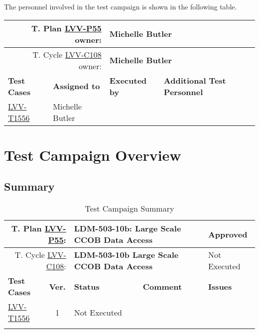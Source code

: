 \documentclass[DM,lsstdraft,STR,toc]{lsstdoc}
\begin{document}
The personnel involved in the test campaign is shown in the following table.

{\small
\begin{longtable}{p{3cm}p{3cm}p{3cm}p{6cm}}
\hline
\multicolumn{2}{r}{T. Plan \href{https://jira.lsstcorp.org/secure/Tests.jspa\#/testPlan/LVV-P55}{LVV-P55} owner:} &
\multicolumn{2}{l}{\textbf{ Michelle Butler } }\\\hline
\multicolumn{2}{r}{T. Cycle \href{https://jira.lsstcorp.org/secure/Tests.jspa\#/testCycle/LVV-C108}{LVV-C108} owner:} &
\multicolumn{2}{l}{\textbf{
Michelle Butler }
} \\\hline
\textbf{Test Cases} & \textbf{Assigned to} & \textbf{Executed by} & \textbf{Additional Test Personnel} \\ \hline
\href{https://jira.lsstcorp.org/secure/Tests.jspa#/testCase/LVV-T1556}{LVV-T1556}
& {\small Michelle Butler } & {\small  } &
\begin{minipage}[]{6cm}
\smallskip
{\small  }
\medskip
\end{minipage}
\\ \hline
\end{longtable}
}

\newpage

\section{Test Campaign Overview}
\label{sect:overview}

\subsection{Summary}
\label{sect:summarytable}

{\small
\begin{longtable}{p{2cm}cp{2.3cm}p{8.6cm}p{2.3cm}}
\toprule
\multicolumn{2}{r}{ T. Plan \href{https://jira.lsstcorp.org/secure/Tests.jspa\#/testPlan/LVV-P55}{LVV-P55}:} &
\multicolumn{2}{p{10.9cm}}{\textbf{ LDM-503-10b: Large Scale CCOB Data Access }} & Approved \\\hline
\multicolumn{2}{r}{ T. Cycle \href{https://jira.lsstcorp.org/secure/Tests.jspa\#/testCycle/LVV-C108}{LVV-C108}:} &
\multicolumn{2}{p{10.9cm}}{\textbf{ LDM-503-10b Large Scale CCOB Data Access }} & Not Executed \\\hline
\textbf{Test Cases} &  \textbf{Ver.} & \textbf{Status} & \textbf{Comment} & \textbf{Issues} \\\toprule
\href{https://jira.lsstcorp.org/secure/Tests.jspa#/testCase/LVV-T1556}{LVV-T1556}
&  1
& Not Executed &
\begin{minipage}[]{9cm}
\smallskip

\medskip
\end{minipage}
&
\\\hline
\caption{Test Campaign Summary}
\label{table:summary}
\end{longtable}
}
\end{document}
